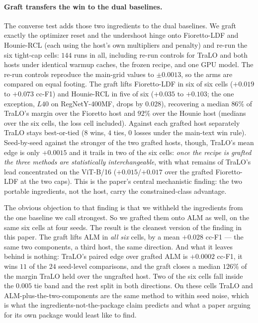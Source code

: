 \documentclass[10pt]{article}
\begin{document}
\paragraph{Graft transfers the win to the dual baselines.}
The converse test adds those two ingredients to the dual baselines. We
graft exactly the optimizer reset and the undershoot hinge onto
Fioretto-LDF and Hounie-RCL (each using the host's own multipliers and
penalty) and re-run the six tight-cap cells: $144$ runs in all, including
re-run controls for TraLO and both hosts under identical warmup caches,
the frozen recipe, and one GPU model. The re-run controls reproduce the
main-grid values to $\pm0.0013$, so the arms are compared on equal
footing. The graft lifts Fioretto-LDF in six of six cells ($+0.019$ to
$+0.073$ cc-F1) and Hounie-RCL in five of six ($+0.035$ to $+0.103$; the
one exception, $L40$ on RegNet{\color{blue}Y-400MF}, drops by $0.028$), recovering a median
$86\%$ of TraLO's margin over the Fioretto host and $92\%$ over the
Hounie host (medians over the six cells, the loss cell included). Against
each grafted host separately TraLO stays best-or-tied ($8$ wins, $4$
ties, $0$ losses under the main-text win rule). Seed-by-seed against the
stronger of the two grafted hosts, though, TraLO's mean edge is only
$+0.0015$ and it trails in two of the six cells: \emph{once the recipe is
grafted the three methods are statistically interchangeable}, with what
remains of TraLO's lead concentrated on the ViT-B/16 ($+0.015$/$+0.017$
over the grafted Fioretto-LDF at the two caps). This is the paper's
central mechanistic finding: the two portable ingredients, not the host,
carry the constrained-class advantage.

{\color{blue}
The obvious objection to that finding is that we withheld the ingredients from
the one baseline we call strongest. So we grafted them onto ALM as well, on the
same six cells at four seeds. The result is the cleanest version of the finding
in this paper. The graft lifts ALM in \emph{all six} cells, by a mean $+0.028$
cc-F1 --- the same two components, a third host, the same direction. And what it
leaves behind is nothing: TraLO's paired edge over grafted ALM is $+0.0002$
cc-F1, it wins $11$ of the $24$ seed-level comparisons, and the graft closes a
median $126\%$ of the margin TraLO held over the ungrafted host. Two of the six
cells fall inside the $0.005$ tie band and the rest split in both directions.
On these cells TraLO and ALM-plus-the-two-components are the same method to
within seed noise, which is what the ingredients-not-the-package claim predicts
and what a paper arguing for its own package would least like to find.}
\end{document}
